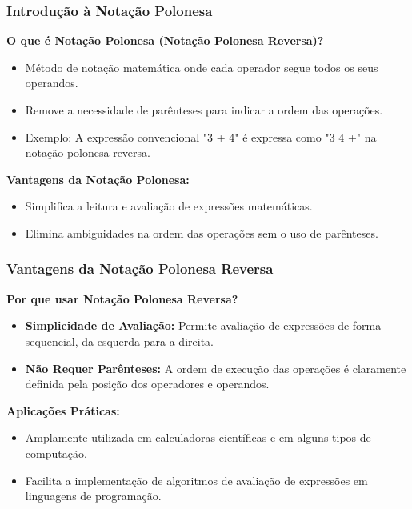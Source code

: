 \begin{frame}[fragile]
  \frametitle{Introdução à Notação Polonesa}
  
  \textbf{O que é Notação Polonesa (Notação Polonesa Reversa)?}
  \begin{itemize}
    \item Método de notação matemática onde cada operador segue todos os seus operandos.
    \item Remove a necessidade de parênteses para indicar a ordem das operações.
    \item Exemplo: A expressão convencional "3 + 4" é expressa como "3 4 +" na notação polonesa reversa.
  \end{itemize}
  
  \textbf{Vantagens da Notação Polonesa:}
  \begin{itemize}
    \item Simplifica a leitura e avaliação de expressões matemáticas.
    \item Elimina ambiguidades na ordem das operações sem o uso de parênteses.
  \end{itemize}
\end{frame}
\begin{frame}[fragile]
  \frametitle{Vantagens da Notação Polonesa Reversa}
  
  \textbf{Por que usar Notação Polonesa Reversa?}
  \begin{itemize}
    \item \textbf{Simplicidade de Avaliação:} Permite avaliação de expressões de forma sequencial, da esquerda para a direita.
    \item \textbf{Não Requer Parênteses:} A ordem de execução das operações é claramente definida pela posição dos operadores e operandos.
  \end{itemize}
  
  \textbf{Aplicações Práticas:}
  \begin{itemize}
    \item Amplamente utilizada em calculadoras científicas e em alguns tipos de computação.
    \item Facilita a implementação de algoritmos de avaliação de expressões em linguagens de programação.
  \end{itemize}
\end{frame}
